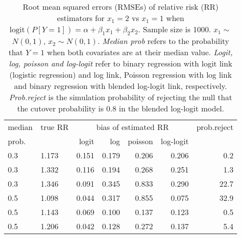 \documentclass[12pt,a4paper]{article}
\begin{document}
\begin{table}[H] 
\small\sf\centering 
\caption{Root mean squared errors (RMSEs) of relative risk (RR) estimators for $x_1=2$ vs $x_1=1$ when $\mbox{logit}(P[Y=1])=\alpha+\beta_1 x_1 + \beta_2 x_2$. Sample size is 1000. $x_1 \sim $$N(0,1)$, $x_2 \sim N(0,1)$. {\it Median prob} refers to the probability that $Y=1$ when both covariates are at their median value. {\it Logit, log, poisson and log-logit} refer to binary regression with logit link (logistic regression) and log link, Poisson regression with log link and binary regression with blended log-logit link, respectively. {\it Prob.reject} is the simulation probability of rejecting the null that the cutover probability is $0.8$ in the blended log-logit model.} 
\begin{tabular}{llrrrrr} 
\toprule 
median & true RR & \multicolumn{4}{c}{bias of estimated RR} & prob.reject \\ 
prob. & & logit & log & poisson & log-logit  & \\ \midrule 
0.3 & 1.173 & 0.151 & 0.179 & 0.206 & 0.206 &  0.2 \\  
0.3 & 1.332 & 0.116 & 0.194 & 0.268 & 0.251 &  1.3 \\  
0.3 & 1.346 & 0.091 & 0.345 & 0.833 & 0.290 & 22.7 \\  
0.5 & 1.098 & 0.044 & 0.317 & 0.855 & 0.075 & 32.9 \\  
0.5 & 1.143 & 0.069 & 0.100 & 0.137 & 0.123 &  0.5 \\  
0.5 & 1.206 & 0.042 & 0.128 & 0.272 & 0.137 &  5.4 \\  
\bottomrule 
\end{tabular} 
\end{table} 
\end{document}
